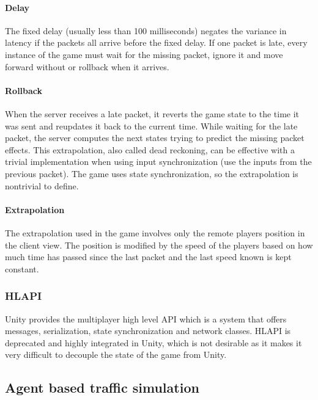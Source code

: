 \documentclass[12pt]{article}
\begin{document}
\paragraph{Delay}
The fixed delay (usually less than 100 milliseconds) negates the variance in latency if the packets all arrive before the fixed delay. If one packet is late, every instance of the game must wait for the missing packet, ignore it and move forward without or rollback when it arrives.

\paragraph{Rollback}
When the server receives a late packet, it reverts the game state to the time it was sent and reupdates it back to the current time. While waiting for the late packet, the server computes the next states trying to predict the missing packet effects. This extrapolation, also called dead reckoning, can be effective with a trivial implementation when using input synchronization (use the inputs from the previous packet). The game uses state synchronization, so the extrapolation is nontrivial to define.

\paragraph{Extrapolation}
The extrapolation used in the game involves only the remote players position in the client view. The position is modified by the speed of the players based on how much time has passed since the last packet and the last speed known is kept constant.

\subsubsection{HLAPI \cite{hlapi}}
Unity provides the multiplayer high level API which is a system that offers messages, serialization, state synchronization and network classes. HLAPI is deprecated and highly integrated in Unity, which is not desirable as it makes it very difficult to decouple the state of the game from Unity.

\clearpage

\subsection{Agent based traffic simulation}
\end{document}
